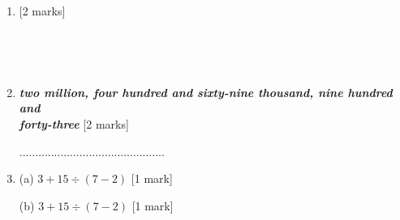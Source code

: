 \documentclass{article}
\begin{document}
\begin{enumerate}
    


\item \quad {}   \hspace{2cm} [2 marks]
 \par
 \vspace{20pt}

\noindent \dotuline{\hspace{17cm}} \\
\par
\noindent \dotuline{\hspace{17cm}} \\
\vspace{10pt}
\hline
\vspace{10pt}

\item \quad {} \textit{\textbf{two million, four hundred and sixty-nine thousand, nine hundred and }} \\
\textit{\textbf{forty-three}}  \hspace{2cm} [2 marks]

 
 \par
 \vspace{60pt}
 ..............................................

 \vspace{20pt}
 \hline
 \vspace{10pt}

\item (a) \quad \( 3 + 15 \div (7 - 2 ) \) \hspace{2cm} [1 mark]
\vspace{80pt}
\hline
\vspace{10pt}

(b) \quad \( 3 + 15 \div (7 - 2 ) \) \hspace {2cm} [1 mark]
\vspace{80pt}
\hline
\vspace{10pt}

\end{enumerate}
\end{document}
